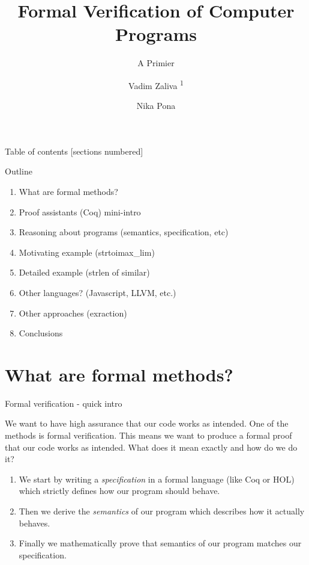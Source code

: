 \documentclass[10pt]{beamer}
\title{Formal Verification of Computer Programs}
\subtitle{A Primier}
\date{\date{}}
\author[shortname]{Vadim Zaliva \textsuperscript{1} \and Nika Pona \inst{2}}
\institute[shortinst]{\textsuperscript{1} Carnegie Mellon  University \and \inst{2} Digamma.ai}
\begin{document}
\maketitle

\begin{frame}{Table of contents}
  [sections numbered]
  \tableofcontents[hideallsubsections]
\end{frame}

\begin{frame}{Outline}
    \begin{enumerate}
        \item What are formal methods?
        \item Proof assistants (Coq) mini-intro
        \item Reasoning about programs (semantics, specification, etc)
        \item Motivating example (strtoimax\_lim)
        \item Detailed example (strlen of similar)
        \item Other languages? (Javascript, LLVM, etc.)
        \item Other approaches (exraction)
        \item Conclusions
    \end{enumerate}
\end{frame}

\section{What are formal methods?}
\begin{frame}{Formal verification - quick intro}
 
  We want to have high assurance that our code works as intended. One of the methods is formal verification. This means we want to produce a formal proof that our code works as intended. What does it mean exactly and how do we do it?
  
  \begin{enumerate}
  \item We start by writing a \emph{specification} in a formal language (like Coq or HOL) which strictly defines how our program should behave.
  \item Then we derive the \emph{semantics} of our program which describes how it actually behaves. 
  \item Finally we mathematically prove that semantics of our program matches our specification.
\end{enumerate}
  
\end{frame}
\end{document}
